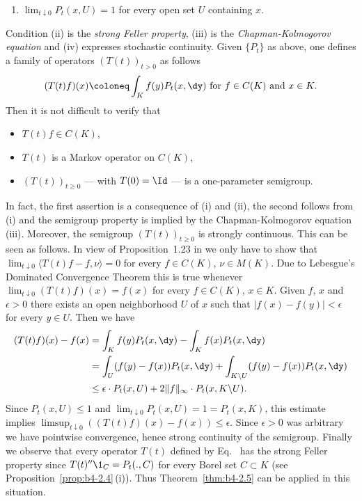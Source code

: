\begin{example}
\begin{enumerate}[\upshape (i)]
    \item 
    $\lim_{t\downarrow0} P_t(x,U) = 1$ for every open set $U$ containing $x$.
\end{enumerate}
Condition (ii) is the \emph{strong Feller property}, (iii) is the \emph{Chapman-Kolmogorov equation} and (iv) expresses stochastic continuity.
Given $\{P_t\}$ as above, one defines a family of operators $(T(t))_{t>0}$ as follows
\begin{equation}\label{eq:b4-2.4}
    (T(t)f)(x)  \coloneq  \int_K f(y)P_t(x,\dy)  \text{ for } f \in C(K)  \text{ and } x \in K .
\end{equation}
Then it is not difficult to verify that 
\begin{itemize}[-] 
    \item 
    $T(t)f \in C(K)$, 
    \item 
    $T(t)$ is a Markov operator on $C(K)$, 
    \item 
    $(T(t))_{t \geq 0}$ --- with $T(0) = \Id $ --- is a one-parameter semigroup.
\end{itemize}
In fact, the first assertion is a consequence of (i) and (ii), the second follows from (i) and the semigroup property is implied by the Chapman-Kolmogorov equation (iii).
Moreover, the semigroup $(T(t))_{t \geq 0}$ is strongly continuous.
This can be seen as follows. 
In view of Proposition~1.23 in \textcite{davies:1980} we only have
to show that $\lim_{t\downarrow 0}\langle T(t)f-f,\nu\rangle = 0$ for every $f \in C(K)$, $\nu \in M(K)$.
Due to Lebesgue's Dominated Convergence Theorem this is true whenever
$\lim_{t\downarrow0}(T(t)f)(x) = f(x)$ for every $f \in C(K)$, $x \in K$.
Given $f$, $x$
and $\epsilon > 0$ there exists an open neighborhood $U$ of\/ $x$ such that
$|f(x) - f(y)| < \epsilon$ for every $y \in U$.
Then we have
\begin{align*} 
    (T(t)f)(x) - f(x) &= \int_K f(y)P_t(x,\dy) - \int_K f(x)P_t(x,\dy) \\
    &= \int_U (f(y)-f(x))P_t(x,\dy) + \int_{K\backslash U} (f(y)-f(x))P_t(x,\dy)  \\
    &\leq \epsilon\cdot P_t(x,U) + 2\|f\|_{\infty}\cdot P_t(x,K\backslash U) .
\end{align*}
Since $P_t(x,U) \leq 1$ and $\lim_{t\downarrow0} P_t(x,U) = 1 = P_t(x,K)$, this estimate
implies $\limsup_{t\downarrow 0}((T(t)f)(x) - f(x)) \leq \epsilon$.
Since $\epsilon > 0$ was arbitrary we have pointwise convergence, hence strong continuity of the semigroup.
Finally we observe that every operator $T(t)$ defined by Eq.~ has the
strong Feller property since $T(t)''\1_C = P_t(.,C)$ for every Borel set
$C \subset K$ (see Proposition~\ref{prop:b4-2.4}\,(i)).
Thus Theorem~\ref{thm:b4-2.5} can be applied in this situation.
\end{example}

